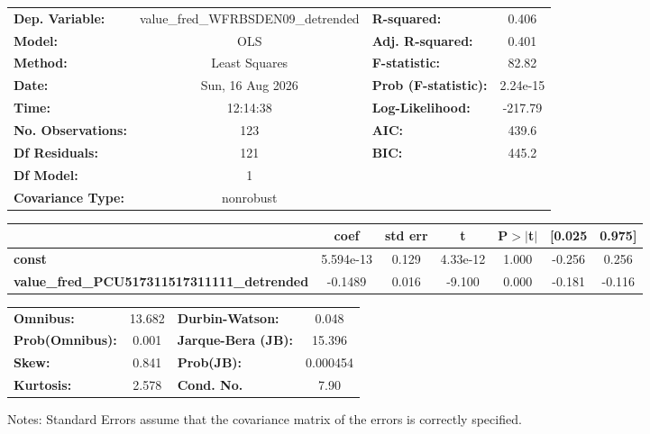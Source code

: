 \begin{center}
\begin{tabular}{lclc}
\toprule
\textbf{Dep. Variable:}                             & value\_fred\_WFRBSDEN09\_detrended & \textbf{  R-squared:         } &     0.406   \\
\textbf{Model:}                                     &                OLS                 & \textbf{  Adj. R-squared:    } &     0.401   \\
\textbf{Method:}                                    &           Least Squares            & \textbf{  F-statistic:       } &     82.82   \\
\textbf{Date:}                                      &          Sun, 16 Aug 2026          & \textbf{  Prob (F-statistic):} &  2.24e-15   \\
\textbf{Time:}                                      &              12:14:38              & \textbf{  Log-Likelihood:    } &   -217.79   \\
\textbf{No. Observations:}                          &                  123               & \textbf{  AIC:               } &     439.6   \\
\textbf{Df Residuals:}                              &                  121               & \textbf{  BIC:               } &     445.2   \\
\textbf{Df Model:}                                  &                    1               & \textbf{                     } &             \\
\textbf{Covariance Type:}                           &             nonrobust              & \textbf{                     } &             \\
\bottomrule
\end{tabular}
\begin{tabular}{lcccccc}
                                                    & \textbf{coef} & \textbf{std err} & \textbf{t} & \textbf{P$> |$t$|$} & \textbf{[0.025} & \textbf{0.975]}  \\
\midrule
\textbf{const}                                      &    5.594e-13  &        0.129     &  4.33e-12  &         1.000        &       -0.256    &        0.256     \\
\textbf{value\_fred\_PCU517311517311111\_detrended} &      -0.1489  &        0.016     &    -9.100  &         0.000        &       -0.181    &       -0.116     \\
\bottomrule
\end{tabular}
\begin{tabular}{lclc}
\textbf{Omnibus:}       & 13.682 & \textbf{  Durbin-Watson:     } &    0.048  \\
\textbf{Prob(Omnibus):} &  0.001 & \textbf{  Jarque-Bera (JB):  } &   15.396  \\
\textbf{Skew:}          &  0.841 & \textbf{  Prob(JB):          } & 0.000454  \\
\textbf{Kurtosis:}      &  2.578 & \textbf{  Cond. No.          } &     7.90  \\
\bottomrule
\end{tabular}
\end{center}

Notes: \newline
 [1] Standard Errors assume that the covariance matrix of the errors is correctly specified.